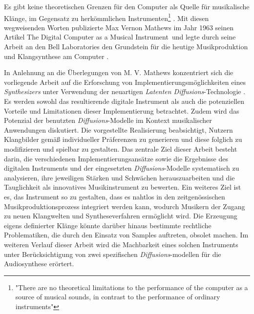 \documentclass[
  a4paper,  %
  twoside,  %
  bibliography=totoc,
  headsepline,
  cleardoublepage=empty,
  parskip=half,
  draft=false
]{scrbook}
\begin{document}
\glqq Es gibt keine theoretischen Grenzen für den Computer als Quelle für musikalische Klänge, im Gegensatz zu herkömmlichen Instrumenten\grqq \footnote{"There are no theoretical limitations to the performance of the computer as a source of musical sounds, in contrast to the performance of ordinary instruments"} \cite{mathews_digital_1963}. Mit diesen wegweisenden Worten publizierte Max Vernon Mathews im Jahr 1963 seinen Artikel \glqq The Digital Computer as a Musical Instrument\grqq \, und legte durch seine Arbeit an den Bell Laboratories den Grundstein für die heutige Musikproduktion und Klangsynthese am Computer \cite{mathews_music_2004}.

In Anlehnung an die Überlegungen von M. V. Mathews konzentriert sich die vorliegende Arbeit auf die Erforschung von Implementierungsmöglichkeiten eines \emph{Synthesizers} unter Verwendung der neuartigen \emph{Latenten Diffusions}-Technologie \cite{rombach_high-resolution_2022}. Es werden sowohl das resultierende digitale Instrument als auch die potenziellen Vorteile und Limitationen dieser Implementierung betrachtet. Zudem wird das Potenzial der benutzten \emph{Diffusions}-Modelle im Kontext musikalischer Anwendungen diskutiert. Die vorgestellte Realisierung beabsichtigt, Nutzern Klangbilder gemäß individueller Präferenzen zu generieren und diese folglich zu modifizieren und spielbar zu gestalten. Das zentrale Ziel dieser Arbeit besteht darin, die verschiedenen Implementierungsansätze sowie die Ergebnisse des digitalen Instruments und der eingesetzten \emph{Diffusions}-Modelle systematisch zu analysieren, ihre jeweiligen Stärken und Schwächen herauszuarbeiten und die Tauglichkeit als innovatives Musikinstrument zu bewerten. Ein weiteres Ziel ist es, das Instrument so zu gestalten, dass es nahtlos in den zeitgenössischen Musikproduktionsprozess integriert werden kann, wodurch Musikern der Zugang zu neuen Klangwelten und Syntheseverfahren ermöglicht wird. Die Erzeugung eigens definierter Klänge könnte darüber hinaus bestimmte rechtliche Problematiken, die durch den Einsatz von Samples auftreten, obsolet machen. Im weiteren Verlauf dieser Arbeit wird die Machbarkeit eines solchen Instruments unter Berücksichtigung von zwei spezifischen \emph{Diffusions}-modellen für die Audiosynthese erörtert.
\end{document}
